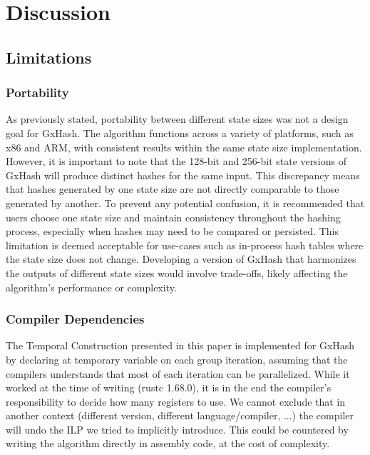 \documentclass[10pt]{article}
\begin{document}
\section{Discussion}
\subsection{Limitations}

\subsubsection{Portability}
As previously stated, portability between different state sizes was not a design goal for GxHash. The algorithm functions across a variety of platforms, such as x86 and ARM, with consistent results within the same state size implementation. However, it is important to note that the 128-bit and 256-bit state versions of GxHash will produce distinct hashes for the same input. This discrepancy means that hashes generated by one state size are not directly comparable to those generated by another. To prevent any potential confusion, it is recommended that users choose one state size and maintain consistency throughout the hashing process, especially when hashes may need to be compared or persisted. This limitation is deemed acceptable for use-cases such as in-process hash tables where the state size does not change. Developing a version of GxHash that harmonizes the outputs of different state sizes would involve trade-offs, likely affecting the algorithm’s performance or complexity.

\subsubsection{Compiler Dependencies} 
The Temporal Construction presented in this paper is implemented for GxHash by declaring at temporary variable on each group iteration, assuming that the compilers understands that most of each iteration can be parallelized. While it worked at the time of writing (rustc 1.68.0), it is in the end the compiler's responsibility to decide how many registers to use. We cannot exclude that in another context (different version, different language/compiler, ...) the compiler will undo the ILP we tried to implicitly introduce. This could be countered by writing the algorithm directly in assembly code, at the cost of complexity.
\end{document}
